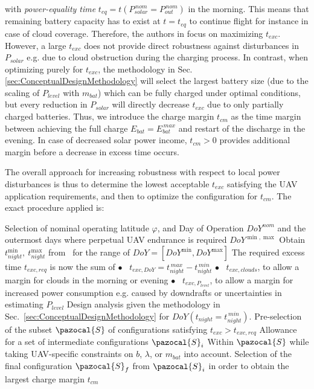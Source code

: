 with \textit{power-equality time} $t_{eq}=t(P_{solar}^{\,nom}=P_{out}^{\,nom})$ in the morning. This means that remaining battery capacity has to exist at $t=t_{eq}$ to continue flight for instance in case of cloud coverage. Therefore, the authors in \cite{Noth_PhD,Leutenegger_JIRS} focus on maximizing $t_{exc}$. However, a large $t_{exc}$ does not provide direct robustness against disturbances in $P_{solar}$ e.g. due to cloud obstruction during the charging process. In contrast, when optimizing purely for $t_{exc}$, the methodology in Sec. \ref{sec:ConceptualDesignMethodology} will select the largest battery size (due to the scaling of $P_{level}$ with $m_{bat}$) which can be fully charged under optimal conditions, but every reduction in $P_{solar}$ will directly decrease $t_{exc}$ due to only partially charged batteries. Thus, we introduce the charge margin $t_{cm}$ as the time margin between achieving the full charge $E_{bat}=E_{bat}^{\,max}$ and restart of the discharge in the evening. In case of decreased solar power income, $t_{cm}>0$ provides additional margin before a decrease in excess time occurs.

The overall approach for increasing robustness with respect to local power disturbances is thus to determine the lowest acceptable $t_{exc}$ satisfying the UAV application requirements, and then to optimize the configuration for $t_{cm}$. The exact procedure applied is:
\vspace{-3ex}
\begin{algorithm}[htp]
  \SetAlgoLined\DontPrintSemicolon
  \myproc{} %
  {
  \nl Selection of nominal operating latitude $\varphi$, and Day of Operation $DoY^{nom}$ and the outermost days where perpetual UAV endurance is required $DoY^{\min,\max}$ \;
  \nl Obtain $t_{night}^{\min},~t_{night}^{\max}$ from~\cite{Duffie_SolarEngineering} for the range of $DoY=[DoY^{\min},DoY^{\max}]$ \;
  \nl The required excess time $t_{exc,req}$ is now the sum of  \; 
  \pushline
  \nonl \scriptsize$\bullet$\normalsize~  $t_{exc,DoY} = t_{night}^{\,max}-t_{night}^{\,min}$ \;
  \nonl \scriptsize$\bullet$\normalsize~  $t_{exc,clouds}$, to allow a margin for clouds in the morning or evening \;
  \nonl \scriptsize$\bullet$\normalsize~  $t_{exc,P_{level}}$, to allow a margin for increased power consumption e.g. caused by downdrafts or uncertainties in estimating $P_{level}$ \;
  \popline \nl 
  \nl Design analysis given the methodology in Sec.~\ref{sec:ConceptualDesignMethodology} for $DoY(t_{night}=t_{night}^{\,min})$. Pre-selection of the subset $\pazocal{S}$ of configurations satisfying $t_{exc}>t_{exc,req}$  \;
  \nl Allowance for a set of intermediate configurations $\pazocal{S}_i$ Within $\pazocal{S}$ while taking UAV-specific constraints on $b$, $\lambda$, or $m_{bat}$ into account. Selection of the final configuration $\pazocal{S}_f$  from $\pazocal{S}_i$ in order to obtain the largest charge margin $t_{cm}$ %

 }
\end{algorithm}

